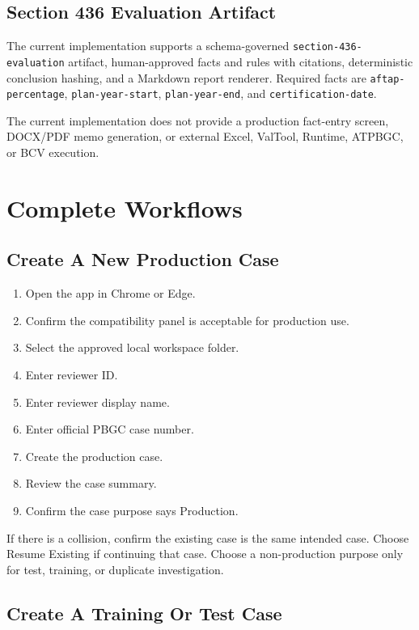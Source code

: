 \section{Section 436 Evaluation Artifact}

The current implementation supports a schema-governed \texttt{section-436-evaluation} artifact, human-approved facts and rules with citations, deterministic conclusion hashing, and a Markdown report renderer. Required facts are \texttt{aftap-percentage}, \texttt{plan-year-start}, \texttt{plan-year-end}, and \texttt{certification-date}.

The current implementation does not provide a production fact-entry screen, DOCX/PDF memo generation, or external Excel, ValTool, Runtime, ATPBGC, or BCV execution.

\chapter{Complete Workflows}

\section{Create A New Production Case}

\begin{enumerate}
  \item Open the app in Chrome or Edge.
  \item Confirm the compatibility panel is acceptable for production use.
  \item Select the approved local workspace folder.
  \item Enter reviewer ID.
  \item Enter reviewer display name.
  \item Enter official PBGC case number.
  \item Create the production case.
  \item Review the case summary.
  \item Confirm the case purpose says Production.
\end{enumerate}

If there is a collision, confirm the existing case is the same intended case. Choose Resume Existing if continuing that case. Choose a non-production purpose only for test, training, or duplicate investigation.

\section{Create A Training Or Test Case}

